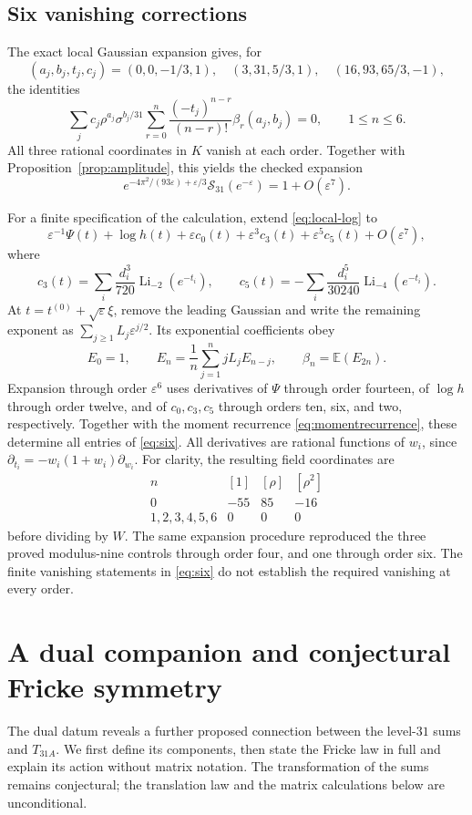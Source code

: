 \documentclass[11pt,reqno]{amsart}
\newcommand{\EE}{\mathbb E}
\newcommand{\Li}{\operatorname{Li}}
\newcommand{\Ssum}{\mathcal S_{31}}
\theoremstyle{remark}
\numberwithin{equation}{section}
\begin{document}
\subsection{Six vanishing corrections}
The exact local Gaussian expansion gives, for
\[
 (a_j,b_j,t_j,c_j)=(0,0,-1/3,1),\quad
 (3,31,5/3,1),\quad(16,93,65/3,-1),
\]
the identities
\begin{equation}\label{eq:six}
 \sum_j c_j\rho^{a_j}\sigma^{b_j/31}
 \sum_{r=0}^n\frac{(-t_j)^{n-r}}{(n-r)!}\beta_r(a_j,b_j)=0,
 \qquad 1\leq n\leq6.
\end{equation}
All three rational coordinates in $K$ vanish at each order.
Together with Proposition~\ref{prop:amplitude}, this yields the checked
expansion
\[
 e^{-4\pi^2/(93\varepsilon)+\varepsilon/3}\Ssum(e^{-\varepsilon})
 =1+O(\varepsilon^7).
\]

For a finite specification of the calculation, extend
\eqref{eq:local-log} to
\[
 \varepsilon^{-1}\Psi(t)+\log h(t)+\varepsilon c_0(t)
 +\varepsilon^3c_3(t)+\varepsilon^5c_5(t)+O(\varepsilon^7),
\]
where
\[
 c_3(t)=\sum_i\frac{d_i^3}{720}\Li_{-2}(e^{-t_i}),\qquad
 c_5(t)=-\sum_i\frac{d_i^5}{30240}\Li_{-4}(e^{-t_i}).
\]
At $t=t^{(0)}+\sqrt\varepsilon\xi$, remove the leading Gaussian and
write the remaining exponent as $\sum_{j\geq1}L_j\varepsilon^{j/2}$.
Its exponential coefficients obey
\begin{equation}\label{eq:En}
 E_0=1,\qquad E_n=\frac1n\sum_{j=1}^n jL_jE_{n-j},\qquad
 \beta_n=\EE(E_{2n}).
\end{equation}
Expansion through order $\varepsilon^6$ uses derivatives of $\Psi$
through order fourteen, of $\log h$ through order twelve, and of
$c_0,c_3,c_5$ through orders ten, six, and two, respectively.
Together with the moment recurrence \eqref{eq:momentrecurrence},
these determine all entries of \eqref{eq:six}.
All derivatives are rational functions of $w_i$, since
$\partial_{t_i}=-w_i(1+w_i)\partial_{w_i}$.
For clarity, the resulting field coordinates are
\[
\begin{array}{c|ccc}
 n&[1]&[\rho]&[\rho^2]\\\hline
 0&-55&85&-16\\
 1,2,3,4,5,6&0&0&0
\end{array}
\]
before dividing by $W$. The same expansion procedure reproduced the
three proved modulus-nine controls through order four, and one through
order six. The finite vanishing statements in \eqref{eq:six} do not
establish the required vanishing at every order.

\section{A dual companion and conjectural Fricke symmetry}
\label{sec:dual-fricke}
The dual datum reveals a further proposed connection between the
level-$31$ sums and $T_{31A}$. We first define its components, then
state the Fricke law in full and explain its action without matrix
notation. The transformation of the sums remains conjectural; the
translation law and the matrix calculations below are unconditional.
\end{document}
